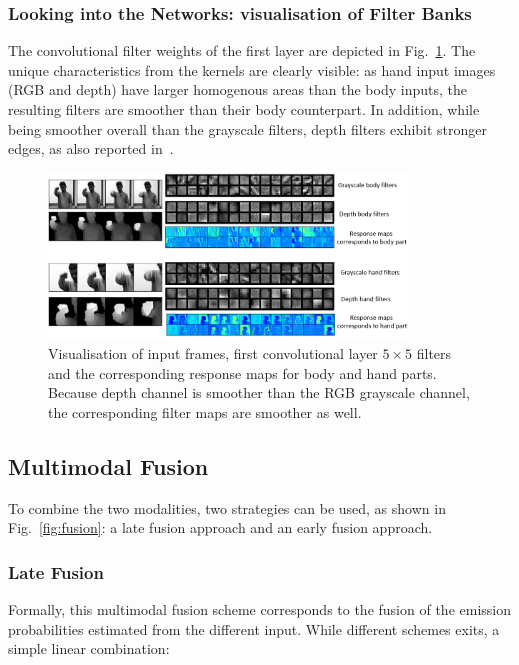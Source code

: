 \subsubsection{Looking into the Networks: visualisation of Filter Banks}

The convolutional filter weights of the first layer are depicted in Fig.~\ref{3dcnn_filters}. 
The unique characteristics from the kernels are clearly visible: as hand input images (RGB and depth) have larger homogenous areas than the body inputs, the resulting filters are smoother than their body counterpart.
In addition, while being smoother overall than the grayscale filters, depth filters exhibit stronger edges, 
 as also reported in~\cite{socher2012convolutional}.

\begin{figure}[t]
  \centering
  \includegraphics[width=0.85\textwidth]{images/CNN_filters}
  \caption{Visualisation of input frames, first convolutional layer $5\times5$ filters and the corresponding response maps for body and hand parts. Because depth channel is smoother than the RGB grayscale channel, the corresponding filter maps are smoother as well. }\label{3dcnn_filters}
\end{figure}


\subsection{Multimodal Fusion}
To combine the two modalities, two strategies can be used, as shown in Fig.~\ref{fig:fusion}: a late fusion approach and an early fusion approach.


\subsubsection{Late Fusion}
Formally, this multimodal fusion scheme corresponds to the fusion of the emission probabilities estimated from the different input. While different schemes exits, a simple linear combination:

